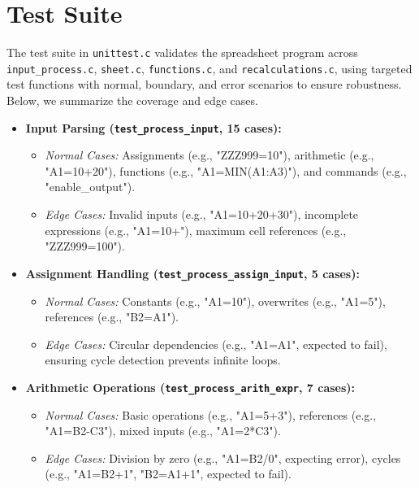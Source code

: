 \documentclass[12pt,letterpaper,onecolumn]{exam}
\begin{document}
\section{Test Suite}

The test suite in \texttt{unittest.c} validates the spreadsheet program across \texttt{input\_process.c}, \texttt{sheet.c}, \texttt{functions.c}, and \texttt{recalculations.c}, using targeted test functions with normal, boundary, and error scenarios to ensure robustness. Below, we summarize the coverage and edge cases.

\begin{itemize}
    \item \textbf{Input Parsing (\texttt{test\_process\_input}, 15 cases):}
    \begin{itemize}
        \item \textit{Normal Cases:} Assignments (e.g., "ZZZ999=10"), arithmetic (e.g., "A1=10+20"), functions (e.g., "A1=MIN(A1:A3)"), and commands (e.g., "enable\_output").
        \item \textit{Edge Cases:} Invalid inputs (e.g., "A1=10+20+30"), incomplete expressions (e.g., "A1=10+"), maximum cell references (e.g., "ZZZ999=100").
    \end{itemize}

    \item \textbf{Assignment Handling (\texttt{test\_process\_assign\_input}, 5 cases):}
    \begin{itemize}
        \item \textit{Normal Cases:} Constants (e.g., "A1=10"), overwrites (e.g., "A1=5"), references (e.g., "B2=A1").
        \item \textit{Edge Cases:} Circular dependencies (e.g., "A1=A1", expected to fail), ensuring cycle detection prevents infinite loops.
    \end{itemize}

    \item \textbf{Arithmetic Operations (\texttt{test\_process\_arith\_expr}, 7 cases):}
    \begin{itemize}
        \item \textit{Normal Cases:} Basic operations (e.g., "A1=5+3"), references (e.g., "A1=B2-C3"), mixed inputs (e.g., "A1=2*C3").
        \item \textit{Edge Cases:} Division by zero (e.g., "A1=B2/0", expecting error), cycles (e.g., "A1=B2+1", "B2=A1+1", expected to fail).
    \end{itemize}


\end{itemize}
\end{document}

